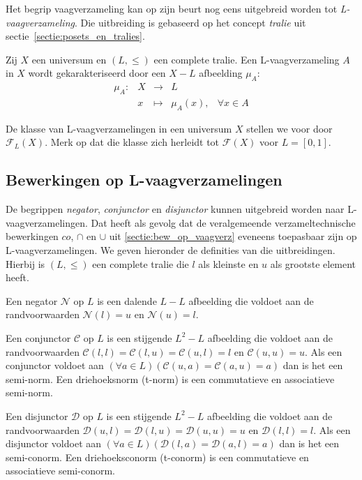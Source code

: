Het begrip vaagverzameling kan op zijn beurt nog eens uitgebreid worden tot 
\emph{L-vaagverzameling}. Die uitbreiding is gebaseerd op het concept \emph{tralie}
uit sectie~\ref{sectie:posets_en_tralies}.
\begin{definitie}
Zij $X$ een universum en $(L,\le)$ een complete tralie. Een L-vaagverzameling $A$ in $X$ wordt
gekarakteriseerd door een $X - L$ afbeelding $\mu_A$:
\begin{displaymath}
\begin{array}{lllll}
\mu_A: 	& X & \to 		& L	& \\
		& x & \mapsto 	& \mu_A(x),		& \forall x \in A
\end{array}
\end{displaymath}
\end{definitie}
\noindent
De klasse van L-vaagverzamelingen in een universum $X$ stellen we voor door 
$\mathcal{F}_L(X)$. Merk op dat die klasse zich herleidt tot $\mathcal{F}(X)$ voor $L = [0,1]$.

\subsection{Bewerkingen op L-vaagverzamelingen}

De begrippen \emph{negator}, \emph{conjunctor} en 
\emph{disjunctor} kunnen uitgebreid worden naar L-vaag\-ver\-za\-me\-ling\-en. Dat heeft als 
gevolg dat de veralgemeende verzameltechnische bewerkingen $co$, $\cap$ en 
$\cup$ uit \ref{sectie:bew_op_vaagverz} eveneens toepasbaar zijn op L-vaagverzamelingen.
We geven hieronder de definities van die uitbreidingen.
Hierbij is $(L,\le)$ een complete tralie die $l$ als kleinste en $u$ als grootste element heeft.
\begin{definitie}
Een negator $\mathcal{N}$ op $L$ is een dalende $L - L$ afbeelding die voldoet
aan de randvoorwaarden $\mathcal{N}(l)=u$ en $\mathcal{N}(u)=l$. 
\end{definitie}
\begin{definitie}
Een conjunctor $\mathcal{C}$ op $L$ is een stijgende $L^2 - L$ afbeelding die voldoet aan de
randvoorwaarden $\mathcal{C}(l,l)=\mathcal{C}(l,u)=\mathcal{C}(u,l)=l$ en $\mathcal{C}(u,u)=u$. 
Als een conjunctor voldoet aan 
$(\forall a \in L)(\mathcal{C}(u,a)=\mathcal{C}(a,u)=a)$ dan is het een semi-norm.
Een driehoeksnorm (t-norm) is een commutatieve en associatieve semi-norm.
\end{definitie}
\begin{definitie}
Een disjunctor $\mathcal{D}$ op $L$ is een stijgende $L^2 - L$ afbeelding die voldoet
aan de randvoorwaarden $\mathcal{D}(u,l)=\mathcal{D}(l,u)=\mathcal{D}(u,u)=u$ en 
$\mathcal{D}(l,l)=l$. Als een disjunctor voldoet aan 
$(\forall a \in L)(\mathcal{D}(l,a)=\mathcal{D}(a,l)=a)$ dan is het een semi-conorm.
Een driehoeksconorm (t-conorm) is een commutatieve en associatieve semi-conorm.
\end{definitie}

